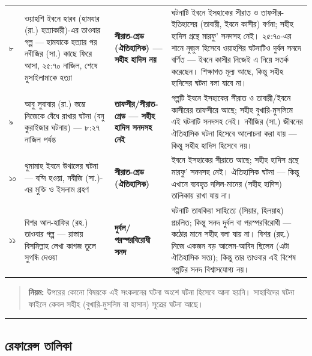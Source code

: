 \begin{table}[h]
\begin{tabular}{llll}
৮ & ওয়াহশি ইবনে হারব (হামযার (রা.) হত্যাকারী)-এর তাওবার গল্প — \lat{“}হামযাকে হত্যার পর নবীজির (সা.) কাছে ফিরে আসা, ২৫:৭০ নাজিল, শেষে মুসাইলামাকে হত্যা\lat{”} & \textbf{সীরাত-গ্রেড (ঐতিহাসিক) — সহীহ হাদিস নয়} & ঘটনাটি ইবনে ইসহাকের সীরাত ও তাফসীর-ইতিহাসের (তাবারী, ইবনে কাসীর) বর্ণনা; সহীহ হাদিস গ্রন্থে মারফু' সনদসহ নেই। ২৫:৭০-এর শানে নুজুল হিসেবে ওয়াহশির ঘটনাটিও দুর্বল সনদে বর্ণিত — ইবনে কাসীর নিজেই এ নিয়ে সতর্ক করেছেন। শিক্ষাগত মূল্য আছে, কিন্তু \lat{“}সহীহ হাদিসের ঘটনা\lat{”} বলা যাবে না। \\
৯ & আবু লুবাবার (রা.) স্তম্ভে নিজেকে বেঁধে রাখার ঘটনা (বনু কুরাইজার ঘটনায়) — ৮:২৭ নাজিল পর্যন্ত & \textbf{তাফসীর/সীরাত-গ্রেড — সহীহ হাদিস সনদসহ নেই} & গল্পটি ইবনে ইসহাকের সীরাত ও তাবারী/ইবনে কাসীরের তাফসীরে আছে; সহীহ বুখারি-মুসলিমে এই ঘটনাটি সনদসহ নেই। নবীজির (সা.) জীবনের ঐতিহাসিক ঘটনা হিসেবে আলোচনা করা যায় — কিন্তু সহীহ হাদিস হিসেবে নয়। \\
১০ & থুমামাহ ইবনে উথালের ঘটনা — বন্দি হওয়া, নবীজি (সা.)-এর মুক্তি ও ইসলাম গ্রহণ & \textbf{সীরাত-গ্রেড (ঐতিহাসিক)} & ইবনে ইসহাকের সীরাতে আছে; সহীহ হাদিস গ্রন্থে মারফু' সনদসহ নেই। ঐতিহাসিক ঘটনা — কিন্তু এখানে ব্যবহৃত দলিল-মানের (সহীহ হাদিস) তালিকায় রাখা যায় না। \\
১১ & বিশর আল-হাফির (রহ.) তাওবার গল্প — রাস্তায় \lat{“}বিসমিল্লাহ\lat{”} লেখা কাগজ তুলে সুগন্ধি দেওয়া & \textbf{দুর্বল/পরস্পরবিরোধী সনদ} & ঘটনাটি তাযকিয়া সাহিত্যে (সিয়ার, হিলয়াহ) প্রচলিত; কিন্তু সনদ দুর্বল বা পরস্পরবিরোধী — কঠোর মানে সহীহ বলা যায় না। বিশর (রহ.) নিজে একজন বড় আলেম-আবিদ ছিলেন (এটা ঐতিহাসিক সত্য); কিন্তু তার তাওবার এই বিশেষ গল্পটির সনদ বিশ্বাসযোগ্য নয়। \\
\hline
\end{tabular}
\end{table}

\begin{quote}
\textbf{নিয়ম:} উপরের কোনো বিষয়কে এই সংকলনের ঘটনা অংশে  ঘটনা হিসেবে আনা হয়নি। সাহাবিদের ঘটনা ফাইলে কেবল সহীহ (বুখারি-মুসলিম বা হাসান) সূত্রের ঘটনা আছে।
\end{quote}

\medskip\hrule\medskip

\subsection*{রেফারেন্স তালিকা}

